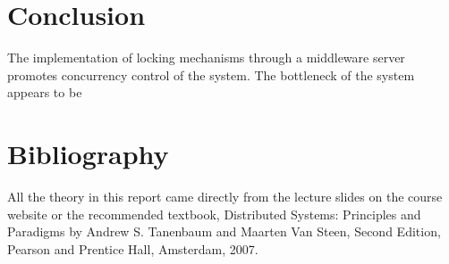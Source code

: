 \documentclass[letterpaper,12pt]{article}
\begin{document}
\section{Conclusion}

The implementation of locking mechanisms through a middleware server promotes concurrency control of the system. The bottleneck of the system appears to be 

\section{Bibliography}

All the theory in this report came directly from the lecture slides on the course website or the recommended textbook, Distributed Systems: Principles and Paradigms by Andrew S. Tanenbaum and Maarten Van Steen, Second Edition, Pearson and Prentice Hall, Amsterdam, 2007. 
\end{document}

